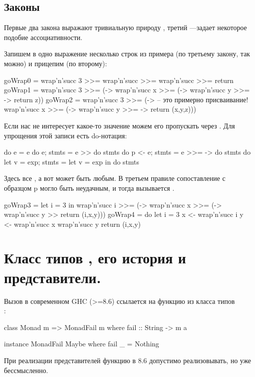 \documentclass[11pt,a4paper]{article}
\begin{document}
\subsection{Законы}
Первые два закона выражают тривиальную природу , третий ---задает некоторое подобие ассоциативности.
Запишем в одно выражение несколько строк из примера (по третьему закону, так можно) и прицепим  (по второму):
\begin{hscode}
goWrap0 = wrap'n'succ 3 >>=
          wrap'n'succ >>=
          wrap'n'succ >>=
          return
goWrap1 = wrap'n'succ 3 >>= (\x ->
          wrap'n'succ x >>= (\y ->
          wrap'n'succ y >>= \z ->
          return z))
goWrap2 = wrap'n'succ 3 >>= (\x ->  -- это примерно присваивание!
          wrap'n'succ x >>= (\y ->
          wrap'n'succ y >>= \z ->
          return (x,y,z)))
\end{hscode}
Если нас не интересует какое-то  значение  можем его пропускать через \hs{>>}.
Для упрощения этой записи есть do-нотация:
\begin{hscode}
do {e}                  = e
do {e; stmts}           = e >> do {stmts}
do {p <- e; stmts}      = e >>= \p -> do {stmts} 
do {let v = exp; stmts} = let v = exp in do {stmts}    
\end{hscode}
Здесь все , а вот  может быть любым. В третьем правиле сопоставление с образцом p могло быть неудачным, и тогда вызывается  .
\begin{hscode}
goWrap3 = let i = 3 in
          wrap'n'succ i >>= (\x ->
          wrap'n'succ x >>= (\y ->
          wrap'n'succ y >>
          return (i,x,y)))
goWrap4 = do
  let i = 3
  x <- wrap'n'succ i
  y <- wrap'n'succ x
  wrap'n'succ y
  return (i,x,y)
\end{hscode}


\section{Класс типов , его история и представители.}
Вызов  в современном GHC (>=8.6) ссылается на функцию из класса типов \\ :
\begin{hscode}
class Monad m => MonadFail m where
	fail :: String -> m a

instance MonadFail Maybe where 
	fail _ = Nothing
\end{hscode}
При реализации представителей  функцию  в 8.6
допустимо реализовывать, но уже бессмысленно.
\end{document}
